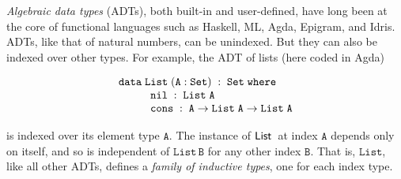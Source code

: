 \documentclass[runningheads]{llncs}
\begin{document}
\vspace*{-0.1in}

{\em Algebraic data types} (ADTs), both built-in and user-defined,
have long been at the core of functional languages such as Haskell,
ML, Agda, Epigram, and Idris. ADTs, like that of natural numbers, can
be unindexed. But they can also be indexed over other types. For
example, the ADT of lists (here coded in Agda)

{\small
\[\begin{array}{l}
\mathtt{data\; List \;(A : Set)\;:\;Set\;where}\\
\hspace*{0.4in}\mathtt{nil\;:\; List\;A}\\
\hspace*{0.4in}\mathtt{cons\;:\;A \rightarrow List\;A \rightarrow List\;A}
\end{array}\]}

\noindent
is indexed over its element type $\mathtt{A}$.  The instance of
$\mathsf{List}\,$ at index $\mathtt{A}$ depends only on itself, and so is
independent of $\mathtt{List\,B}$ for any other index $\mathtt{B}$.
That is, $\mathtt{List}$, like all other ADTs, defines a {\em family
  of inductive types}, one for each index type.
\end{document}
